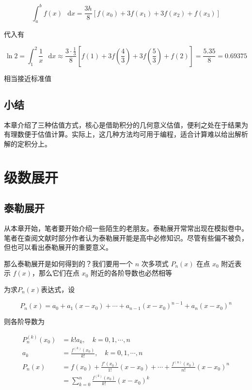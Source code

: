 \documentclass[12pt]{article}
\theoremstyle{definition}
\theoremstyle{plain}
\theoremstyle{definition}
\newcommand{\diff}{\mathop{}\!\mathrm{d}}
\begin{document}
\[\int_{a}^{b}f(x)\,\diff x = \frac{3h}{8}\left\lbrack f\left( x_{0} \right) + 3f\left( x_{1} \right) + 3f\left( x_{2} \right) + f\left( x_{3} \right) \right\rbrack\]

代入有

\[\ln 2 = \int_{1}^{2}\frac{1}{x}\,\diff x \approx \frac{3 \cdot \frac{1}{3}}{8}\left\lbrack f(1) + 3f\left( \frac{4}{3} \right) + 3f\left( \frac{5}{3} \right) + f(2) \right\rbrack = \frac{5.35}{8} = 0.69375\]

相当接近标准值

\subsection{小结}

本章介绍了三种估值方式，核心是借助积分的几何意义估值，便利之处在于结果为有理数便于估值计算。实际上，这几种方法均可用于编程，适合计算难以给出解析解的定积分上。

\section{级数展开}

\subsection{泰勒展开}

从本章开始，笔者要开始介绍一些陌生的老朋友。泰勒展开常常出现在模拟卷中。笔者在查阅文献时部分作者认为泰勒展开能是高中必修知识。尽管有些偏不被负，但也可以看出泰勒展开的重要意义。

那么泰勒展开是如何得到的？我们要用一个 $n$ 次多项式 \(P_{n}(x)\) 在点 \(x_{0}\) 附近表示 \(f(x)\)，那么它们在点 \(x_{0}\) 附近的各阶导数也必然相等

为求\(P_{n}(x)\)表达式，设

\[P_{n}(x) = a_{0} + a_{1}\left( x - x_{0} \right) + \cdots + a_{n - 1}\left( x - x_{0} \right)^{n - 1} + a_{n}\left( x - x_{0} \right)^{n}\]

则各阶导数为

\begin{align*}
P_{n}^{(k)}\left( x_{0} \right) &= k!a_{k}, \quad k = 0,1,\cdots,n \\
a_{k} &= \frac{f^{(k)}\left( x_{0} \right)}{k!}, \quad k = 0,1,\cdots,n \\
P_{n}(x) &= f\left( x_{0} \right) + \frac{f'\left( x_{0} \right)}{1!}\left( x - x_{0} \right) + \cdots + \frac{f^{(n)}\left( x_{0} \right)}{n!}\left( x - x_{0} \right)^{n} \\
&= \sum_{k = 0}^{n}\frac{f^{(k)}\left( x_{0} \right)}{k!}\left( x - x_{0} \right)^{k}
\end{align*}
\end{document}

